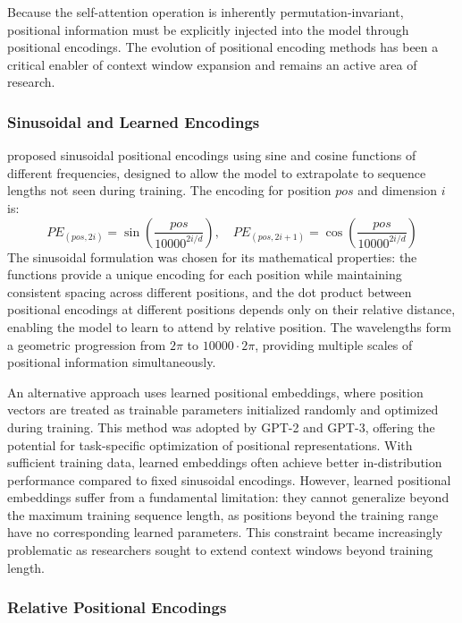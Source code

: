 Because the self-attention operation is inherently permutation-invariant, positional information must be explicitly injected into the model through positional encodings. The evolution of positional encoding methods has been a critical enabler of context window expansion and remains an active area of research.

\subsubsection{Sinusoidal and Learned Encodings}

\citet{vaswani2017attention} proposed sinusoidal positional encodings using sine and cosine functions of different frequencies, designed to allow the model to extrapolate to sequence lengths not seen during training. The encoding for position $pos$ and dimension $i$ is:
\begin{equation}
PE_{(pos, 2i)} = \sin\left(\frac{pos}{10000^{2i/d}}\right), \quad PE_{(pos, 2i+1)} = \cos\left(\frac{pos}{10000^{2i/d}}\right)
\end{equation}
The sinusoidal formulation was chosen for its mathematical properties: the functions provide a unique encoding for each position while maintaining consistent spacing across different positions, and the dot product between positional encodings at different positions depends only on their relative distance, enabling the model to learn to attend by relative position. The wavelengths form a geometric progression from $2\pi$ to $10000 \cdot 2\pi$, providing multiple scales of positional information simultaneously.

An alternative approach uses learned positional embeddings, where position vectors are treated as trainable parameters initialized randomly and optimized during training. This method was adopted by GPT-2 and GPT-3, offering the potential for task-specific optimization of positional representations. With sufficient training data, learned embeddings often achieve better in-distribution performance compared to fixed sinusoidal encodings. However, learned positional embeddings suffer from a fundamental limitation: they cannot generalize beyond the maximum training sequence length, as positions beyond the training range have no corresponding learned parameters. This constraint became increasingly problematic as researchers sought to extend context windows beyond training length.

\subsubsection{Relative Positional Encodings}

